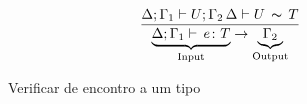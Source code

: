 \begin{figure}[h!]
  \begin{gather*}
    \frac{\Delta;\Gamma_1 \vdash U;\Gamma_2 \, \Delta \vdash U\,\thicksim\,T}
         {\underbrace{\Delta;\Gamma_1 \vdash \, e \colon T}_{\text{Input}} \rightarrow \underbrace{\Gamma_2}_{\text{Output}}}
  \end{gather*}
  \caption{Verificar de encontro a um tipo}
  \label{fig:check-against}
\end{figure}



